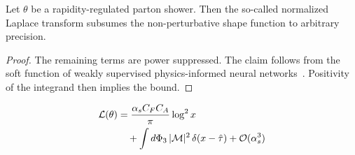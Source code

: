 \begin{corollary}\label{thm:3}
Let $\theta$ be a rapidity-regulated parton shower. Then the so-called
normalized Laplace transform subsumes the non-perturbative shape
function to arbitrary precision.
\end{corollary}

\begin{proof}
The remaining terms are power suppressed. The claim follows from the
soft function of weakly supervised physics-informed neural
networks~\cite{TPC:0489-BRANE-Boosted-Resummed-Attention-Based-Normalized-Emissions-September-19-2026}.
Positivity of the integrand then implies the bound.
\end{proof}

\begin{align}
  \mathcal{L}(\theta) &= \frac{\alpha_s C_F C_A}{\pi} \log^2 x \nonumber \\
  &\quad + \int d\Phi_{3} \, |\mathcal{M}|^2 \, \delta(x - \hat{\tau}) + \mathcal{O}(\alpha_s^3) \label{eq:4}
\end{align}

